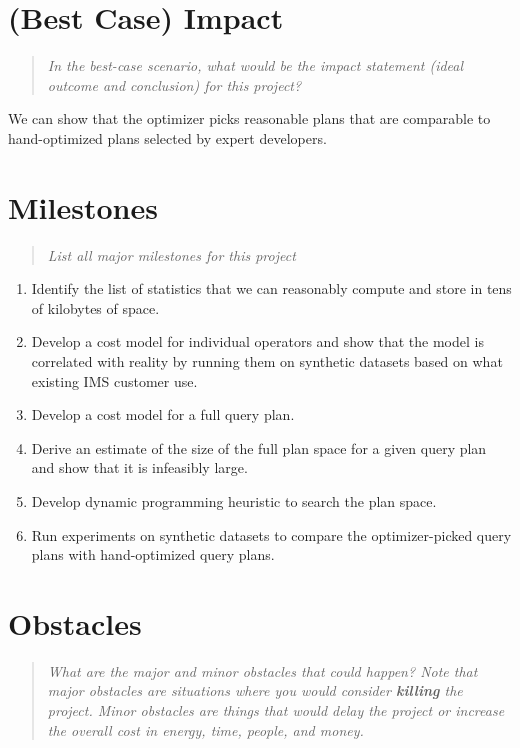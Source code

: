 \documentclass[10pt, sigconf]{acmart}
\begin{document}
\section{(Best Case) Impact}
\begin{quote}
\emph{In the best-case scenario, what would be the impact statement (ideal outcome and conclusion) for this project?} 
\end{quote}

We can show that the optimizer picks reasonable plans that are comparable to hand-optimized plans selected by expert developers.

\section{Milestones}
\begin{quote}
\emph{List all major milestones for this project}
\end{quote}

\begin{enumerate}
  \item Identify the list of statistics that we can reasonably compute and store in tens of kilobytes of space.
  \item Develop a cost model for individual operators and show that the model is correlated with reality by running them on synthetic datasets based on what existing IMS customer use.
  \item Develop a cost model for a full query plan.
  \item Derive an estimate of the size of the full plan space for a given query plan and show that it is infeasibly large.
  \item Develop dynamic programming heuristic to search the plan space.
  \item Run experiments on synthetic datasets to compare the optimizer-picked query plans with hand-optimized query plans.
\end{enumerate}

\section{Obstacles}
\begin{quote}
\emph{What are the major and minor obstacles that could happen? 
Note that major obstacles are situations where you would consider \textbf{killing} the project. 
Minor obstacles are things that would delay the project or increase the overall cost in energy, time, people, and money.}
\end{quote}
\end{document}
